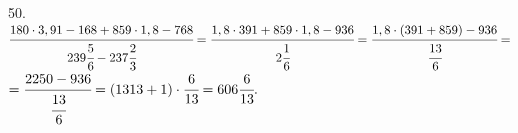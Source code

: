 50. $\cfrac{180\cdot3,91-168+859\cdot1,8-768}{239\cfrac{5}{6}-237\cfrac{2}{3}}=
\cfrac{1,8\cdot391+859\cdot1,8-936}{2\cfrac{1}{6}}=\cfrac{1,8\cdot(391+859)-936}{\cfrac{13}{6}}=$\\$=\cfrac{2250-936}{\cfrac{13}{6}}=
(1313+1)\cdot\cfrac{6}{13}=606\cfrac{6}{13}.$\\
